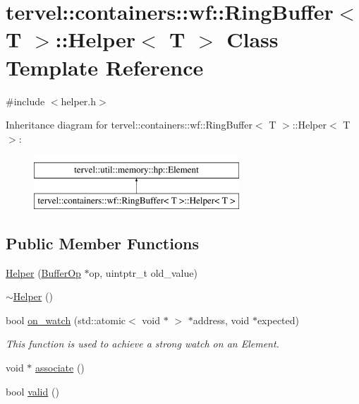 \hypertarget{classtervel_1_1containers_1_1wf_1_1_ring_buffer_1_1_helper}{}\section{tervel\+:\+:containers\+:\+:wf\+:\+:Ring\+Buffer$<$ T $>$\+:\+:Helper$<$ T $>$ Class Template Reference}
\label{classtervel_1_1containers_1_1wf_1_1_ring_buffer_1_1_helper}


{\ttfamily \#include $<$helper.\+h$>$}

Inheritance diagram for tervel\+:\+:containers\+:\+:wf\+:\+:Ring\+Buffer$<$ T $>$\+:\+:Helper$<$ T $>$\+:\begin{figure}[H]
\begin{center}
\leavevmode
\includegraphics[height=2.000000cm]{classtervel_1_1containers_1_1wf_1_1_ring_buffer_1_1_helper}
\end{center}
\end{figure}
\subsection*{Public Member Functions}
\begin{DoxyCompactItemize}
\item 
\hyperlink{classtervel_1_1containers_1_1wf_1_1_ring_buffer_1_1_helper_a727b15617f6bd482ae200aad29e9a062}{Helper} (\hyperlink{classtervel_1_1containers_1_1wf_1_1_ring_buffer_1_1_buffer_op}{Buffer\+Op} $\ast$op, uintptr\+\_\+t old\+\_\+value)
\item 
\hyperlink{classtervel_1_1containers_1_1wf_1_1_ring_buffer_1_1_helper_a27ab01a87150b6b3561485fbb48f1a2d}{$\sim$\+Helper} ()
\item 
bool \hyperlink{classtervel_1_1containers_1_1wf_1_1_ring_buffer_1_1_helper_a2602ee377d46b4b086c5df431b851645}{on\+\_\+watch} (std\+::atomic$<$ void $\ast$ $>$ $\ast$address, void $\ast$expected)
\begin{DoxyCompactList}\small\item\em This function is used to achieve a strong watch on an Element. \end{DoxyCompactList}\item 
void $\ast$ \hyperlink{classtervel_1_1containers_1_1wf_1_1_ring_buffer_1_1_helper_ad9e59b7233276f595218f0731eb61602}{associate} ()
\item 
bool \hyperlink{classtervel_1_1containers_1_1wf_1_1_ring_buffer_1_1_helper_a82987e8211ac1e29b9f08edcee4b17e6}{valid} ()
\end{DoxyCompactItemize}

